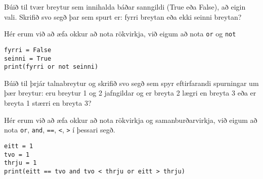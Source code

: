 \begin{exercise}\label{exp2}
Búið til tvær breytur sem innihalda báðar sanngildi (True eða False), að eigin vali.
Skrifið svo segð þar sem spurt er: fyrri breytan eða ekki seinni breytan?
\end{exercise}
\begin{Answer}[ref={exp2}]
Hér erum við að æfa okkur að nota rökvirkja, við eigum að nota \texttt{or} og \texttt{not}
	\begin{lstlisting}
fyrri = False
seinni = True
print(fyrri or not seinni)\end{lstlisting}
\end{Answer}

\begin{exercise}\label{exp3}
Búið til þrjár talnabreytur og skrifið svo segð sem spyr eftirfarandi spurningar um þær breytur: eru breytur 1 og 2 jafngildar og er breyta 2 lægri en breyta 3 eða er breyta 1 stærri en breyta 3?
\end{exercise}
\begin{Answer}[ref={exp3}]
	Hér erum við að æfa okkur að nota rökvirkja og samanburðarvirkja, við eigum að nota \texttt{or}, \texttt{and}, \texttt{==}, \texttt{<}, \texttt{>} í þessari segð.
	\begin{lstlisting}
eitt = 1
tvo = 1
thrju = 1
print(eitt == tvo and tvo < thrju or eitt > thrju)\end{lstlisting}
\end{Answer}

